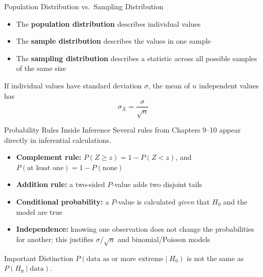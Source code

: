\documentclass[aspectratio=169]{beamer}
\begin{document}
\begin{frame}{Population Distribution vs.\ Sampling Distribution}
\begin{itemize}
  \item The \textbf{population distribution} describes individual values
  \item The \textbf{sample distribution} describes the values in one sample
  \item The \textbf{sampling distribution} describes a statistic across all possible samples of the same size
\end{itemize}

\vspace{0.2cm}
If individual values have standard deviation $\sigma$, the mean of $n$ independent values has
$$\sigma_{\bar{X}}=\frac{\sigma}{\sqrt{n}}$$
\end{frame}

\begin{frame}{Probability Rules Inside Inference}
Several rules from Chapters 9--10 appear directly in inferential calculations.
\begin{itemize}
  \item \textbf{Complement rule:} $P(Z\ge z)=1-P(Z<z)$, and $P(\text{at least one})=1-P(\text{none})$
  \item \textbf{Addition rule:} a two-sided $P$-value adds two disjoint tails
  \item \textbf{Conditional probability:} a $P$-value is calculated \emph{given} that $H_0$ and the model are true
  \item \textbf{Independence:} knowing one observation does not change the probabilities for another; this justifies $\sigma/\sqrt{n}$ and binomial/Poisson models
\end{itemize}

\begin{block}{Important Distinction}
$P(\text{data as or more extreme}\mid H_0)$ is not the same as $P(H_0\mid\text{data})$.
\end{block}
\end{frame}
\end{document}
